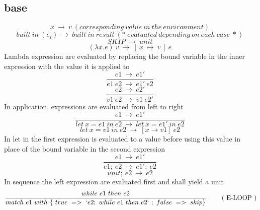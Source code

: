 \documentclass[10pt,a4paper]{article}
\begin{document}
\subsection*{ base }
\begin{equation}x\ \rightarrow \ v\ (corresponding\ value\ in\ the\ environment)\ \tag{\ E-VARIABLE\ }\end{equation}
\begin{equation}built\ in\ (e_i)\ \rightarrow \ built\ in\ result                           \ (*\ evaluated\ depending\ on\ each\ case\ *)\ \tag{\ E-BUILTIN\ }\end{equation}
\begin{equation}SKIP\ \rightarrow \ unit\ \tag{\ E-SKIP\ }\end{equation}
\begin{equation}(\lambda x.e)\ v\ \rightarrow \ [\ x\ \mapsto \ v\ ]\ e\ \tag{\ E-LAMBDA\ }\end{equation}
Lambda expression are evaluated by replacing the bound variable in the inner expression with the value it is applied to
\begin{equation}\frac{e1\ \rightarrow \ e1'}{e1\ e2\ \rightarrow \ e1'\ e2}\ \tag{\ E-APP1\ }\end{equation}
\begin{equation}\frac{e2\ \rightarrow \ e2'}{v1\ e2\ \rightarrow \ v1\ e2'}\ \tag{\ E-APP2\ }\end{equation}
In application, expressions are evaluated from left to right
\begin{equation}\frac{e1\ \rightarrow \ e1'}{let\ x=e1\ in\ e2\ \rightarrow \ let\ x=e1'\ in\ e2}\ \tag{\ E-LET\ }\end{equation}
\begin{equation}let\ x=v1\ in\ e2\ \rightarrow \ [x\rightarrow v1]\ e2\ \tag{\ E-LETIN\ }\end{equation}
In let in the first expression is evaluated to a value before using this value in place of the bound variable in the second expression 
\begin{equation}\frac{e1\ \rightarrow \ e1'}{e1;\ e2\ \rightarrow \ e1';\ e2}\ \tag{\ E-SEQ\ }\end{equation}
\begin{equation}unit;\ e2\ \rightarrow \ e2\ \tag{\ E-SEQNEXT\ }\end{equation}
In sequence the left expression are evaluated first and shall yield a unit
\begin{equation}\frac{while\ e1\ then\ e2}{match\ e1\ with\ \{\ true\ =>\ `e2;\ while\ e1\ then\ e2`\ ;\ false\ =>\ skip\}}\ \tag{\ E-LOOP\ }\end{equation}
\end{document}
